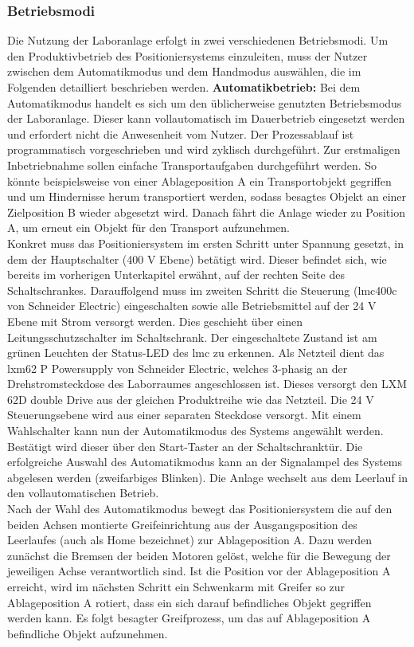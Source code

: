 \documentclass[../../../Bachelorarbeit.tex]{subfiles}
\begin{document}
\subsubsection{Betriebsmodi}
Die Nutzung der Laboranlage erfolgt in zwei verschiedenen Betriebsmodi. Um den Produktivbetrieb des Positioniersystems einzuleiten, muss der Nutzer zwischen dem Automatikmodus und dem Handmodus auswählen, die im Folgenden detailliert beschrieben werden.
\bigskip
\newline
\textbf{Automatikbetrieb:} Bei dem Automatikmodus handelt es sich um den üblicherweise genutzten Betriebsmodus der Laboranlage. Dieser kann vollautomatisch im Dauerbetrieb eingesetzt werden und erfordert nicht die Anwesenheit vom Nutzer. Der Prozessablauf ist programmatisch vorgeschrieben und wird zyklisch durchgeführt. Zur erstmaligen Inbetriebnahme sollen einfache Transportaufgaben durchgeführt werden. So könnte beispielsweise von einer Ablageposition A ein Transportobjekt gegriffen und um Hindernisse herum transportiert werden, sodass besagtes Objekt an einer Zielposition B wieder abgesetzt wird. Danach fährt die Anlage wieder zu Position A, um erneut ein Objekt für den Transport aufzunehmen.\\
Konkret muss das Positioniersystem im ersten Schritt unter Spannung gesetzt, in dem der Hauptschalter (400 \si{V} Ebene) betätigt wird. Dieser befindet sich, wie bereits im vorherigen Unterkapitel erwähnt, auf der rechten Seite des Schaltschrankes. Darauffolgend muss im zweiten Schritt die Steuerung (\acs{lmc}400c von Schneider Electric) eingeschalten sowie alle Betriebsmittel auf der 24 \si{V} Ebene mit Strom versorgt werden. Dies geschieht über einen Leitungsschutzschalter im Schaltschrank. Der eingeschaltete Zustand ist am grünen Leuchten der Status-LED des \acs{lmc} zu erkennen. Als Netzteil dient das \acs{lxm}62 P Powersupply von Schneider Electric, welches 3-phasig an der Drehstromsteckdose des Laborraumes angeschlossen ist. Dieses versorgt den LXM 62D double Drive aus der gleichen Produktreihe wie das Netzteil. Die 24 \si{V} Steuerungsebene wird aus einer separaten Steckdose versorgt. Mit einem Wahlschalter kann nun der Automatikmodus des Systems angewählt werden. Bestätigt wird dieser über den Start-Taster an der Schaltschranktür. Die erfolgreiche Auswahl des Automatikmodus kann an der Signalampel des Systems abgelesen werden (zweifarbiges Blinken). Die Anlage wechselt aus dem Leerlauf in den vollautomatischen Betrieb.\\ 
Nach der Wahl des Automatikmodus bewegt das Positioniersystem die auf den beiden Achsen montierte Greifeinrichtung aus der Ausgangsposition des Leerlaufes (auch als Home bezeichnet) zur Ablageposition A. Dazu werden zunächst die Bremsen der beiden Motoren gelöst, welche für die Bewegung der jeweiligen Achse verantwortlich sind. Ist die Position vor der Ablageposition A erreicht, wird im nächsten Schritt ein Schwenkarm mit Greifer so zur Ablageposition A rotiert, dass ein sich darauf befindliches Objekt gegriffen werden kann. Es folgt besagter Greifprozess, um das auf Ablageposition A befindliche Objekt aufzunehmen.\\
\end{document}
